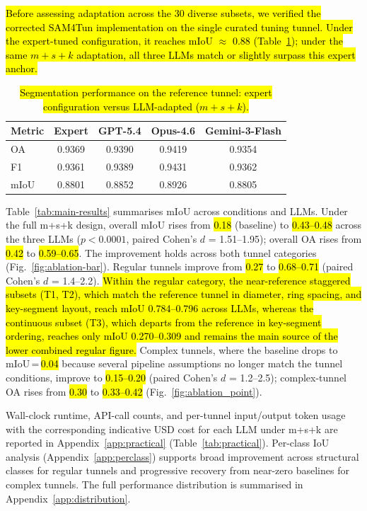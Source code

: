 \documentclass[a4paper,fleqn]{cas-dc}
\begin{document}
{\hl{Before assessing adaptation across the 30 diverse subsets, we verified the corrected SAM4Tun implementation on the single curated tuning tunnel. Under the expert-tuned configuration, it reaches mIoU $\approx$ 0.88 (Table~\ref{tab:reference-tunnel}); under the same \mbox{$m+s+k$} adaptation, all three LLMs match or slightly surpass this expert anchor.}

\begin{table}[ht]
\caption{\hl{Segmentation performance on the reference tunnel: expert configuration versus LLM-adapted (\mbox{$m+s+k$}).}}\label{tab:reference-tunnel}
\begin{tabular*}{\tblwidth}{@{} l c c c c @{}}
\toprule
\textbf{Metric} & \textbf{Expert} & \textbf{GPT-5.4} & \textbf{Opus-4.6} & \textbf{Gemini-3-Flash} \\
\midrule
OA   & 0.9369 & 0.9390 & 0.9419 & 0.9354 \\
F1   & 0.9361 & 0.9389 & 0.9431 & 0.9362 \\
mIoU & 0.8801 & 0.8852 & 0.8926 & 0.8805 \\
\bottomrule
\end{tabular*}
\end{table}

Table~\ref{tab:main-results} summarises mIoU across conditions and LLMs. Under the full m+s+k design, overall mIoU rises from \hl{0.18} (baseline) to \hl{0.43--0.48} across the three LLMs ($p < 0.0001$, paired Cohen's \mbox{$d$} = 1.51--1.95); overall OA rises from \hl{0.42} to \hl{0.59--0.65}. The improvement holds across both tunnel categories (Fig.~\ref{fig:ablation-bar}). Regular tunnels improve from \hl{0.27} to \hl{0.68--0.71} (paired Cohen's \mbox{$d$} = 1.4--2.2). \hl{Within the regular category, the near-reference staggered subsets (T1, T2), which match the reference tunnel in diameter, ring spacing, and key-segment layout, reach mIoU 0.784--0.796 across LLMs, whereas the continuous subset (T3), which departs from the reference in key-segment ordering, reaches only mIoU 0.270--0.309 and remains the main source of the lower combined regular figure.} Complex tunnels, where the baseline drops to mIoU\,=\,\hl{0.04} because several pipeline assumptions no longer match the tunnel conditions, improve to \hl{0.15--0.20} (paired Cohen's \mbox{$d$} = 1.2--2.5); complex-tunnel OA rises from \hl{0.30} to \hl{0.33--0.42} (Fig.~\ref{fig:ablation_point}).

Wall-clock runtime, API-call counts, and per-tunnel input/output token usage with the corresponding indicative USD cost for each LLM under m+s+k are reported in Appendix~\ref{app:practical} (Table~\ref{tab:practical}). Per-class IoU analysis (Appendix~\ref{app:perclass}) supports broad improvement across structural classes for regular tunnels and progressive recovery from near-zero baselines for complex tunnels. The full performance distribution is summarised in Appendix~\ref{app:distribution}. 



}
\end{document}
